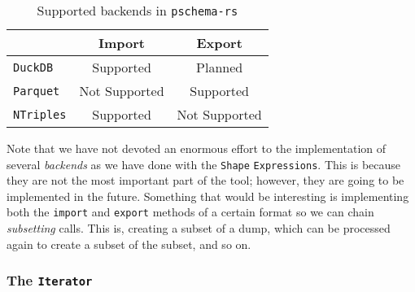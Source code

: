 \begin{table}[ht]
    \centering
    \begin{tabular}{|l|c|c|}
        \hline
        \rowcolor[HTML]{EFEFEF}
        \multicolumn{1}{|c|}{\cellcolor[HTML]{EFEFEF}\textbf{Backend}} & \multicolumn{1}{|c|}{\cellcolor[HTML]{EFEFEF}\textbf{Import}} & \multicolumn{1}{|c|}{\cellcolor[HTML]{EFEFEF}\textbf{Export}} \\ \hline
        \texttt{DuckDB}                                                & {\color[HTML]{009901} Supported}                              & {\color[HTML]{FF4500} Planned}                                \\ \hline
        \texttt{Parquet}                                               & {\color[HTML]{FE0000} Not Supported}                          & {\color[HTML]{009901} Supported}                              \\ \hline
        \texttt{NTriples}                                              & {\color[HTML]{009901} Supported}                              & {\color[HTML]{FE0000} Not Supported}                          \\ \hline
    \end{tabular}
    \caption{Supported backends in \texttt{pschema-rs}}
\end{table}

Note that we have not devoted an enormous effort to the implementation of several \textit{backends} as we have done with the \texttt{Shape} \texttt{Expressions}. This is because they are not the most important part of the tool; however, they are going to be implemented in the future. Something that would be interesting is implementing both the \texttt{import} and \texttt{export} methods of a certain format so we can chain \textit{subsetting} calls. This is, creating a subset of a dump, which can be processed again to create a subset of the subset, and so on.

\subsubsection{The \texttt{Iterator}}

